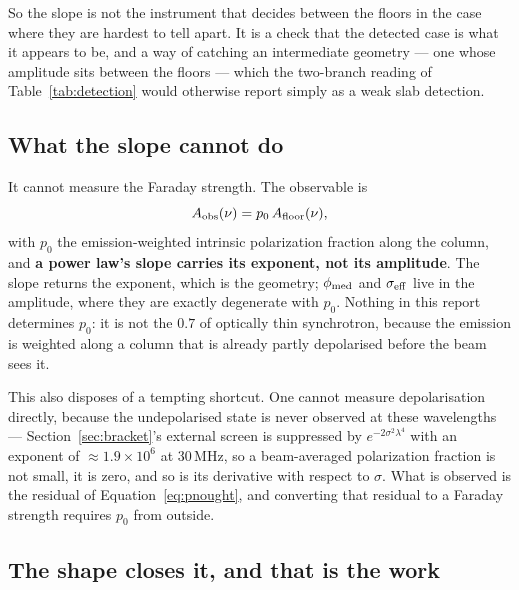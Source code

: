 \documentclass[11pt]{article}
\begin{document}
So the slope is not the instrument that decides between the floors in
the case where they are hardest to tell apart. It is a check that the
detected case is what it appears to be, and a way of catching an
intermediate geometry --- one whose amplitude sits between the floors
--- which the two-branch reading of Table~\ref{tab:detection} would
otherwise report simply as a weak slab detection.

\subsection{What the slope cannot do}
\label{sec:pnought}

It cannot measure the Faraday strength. The observable is
\begin{equation}
  A_{\rm obs}(\nu) = p_{0}\,A_{\rm floor}(\nu),
  \label{eq:pnought}
\end{equation}
with $p_{0}$ the emission-weighted intrinsic polarization fraction
along the column, and \textbf{a power law's slope carries its exponent,
not its amplitude}. The slope returns the exponent, which is the
geometry; $\phi_{\rm med}$ and $\sigma_{\rm eff}$ live in the
amplitude, where they are exactly degenerate with $p_{0}$. Nothing in
this report determines $p_{0}$: it is not the $0.7$ of optically thin
synchrotron, because the emission is weighted along a column that is
already partly depolarised before the beam sees it.

This also disposes of a tempting shortcut. One cannot measure
depolarisation directly, because the undepolarised state is never
observed at these wavelengths --- Section~\ref{sec:bracket}'s external
screen is suppressed by $e^{-2\sigma^{2}\lambda^{4}}$ with an exponent
of $\approx1.9\times10^{6}$ at 30\,MHz, so a beam-averaged
polarization fraction is not small, it is zero, and so is its
derivative with respect to $\sigma$. What is observed is the residual
of Equation~\eqref{eq:pnought}, and converting that residual to a
Faraday strength requires $p_{0}$ from outside.

\subsection{The shape closes it, and that is the work}
\label{sec:shapecloses}
\end{document}
